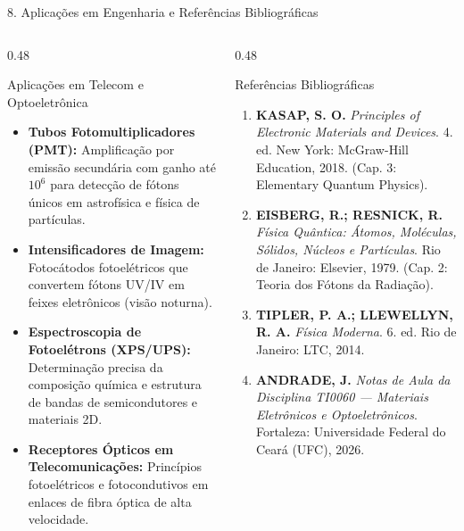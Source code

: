 \documentclass[aspectratio=169, 10pt]{beamer}
\begin{document}
\begin{frame}{8. Aplicações em Engenharia e Referências Bibliográficas}
  \vspace{-0.15cm}
  \begin{columns}[T]
    \begin{column}{0.48\textwidth}
      \begin{block}{Aplicações em Telecom e Optoeletrônica}
        \scriptsize
        \begin{itemize}
          \item \textbf{Tubos Fotomultiplicadores (PMT):} Amplificação por emissão secundária com ganho até $10^6$ para detecção de fótons únicos em astrofísica e física de partículas.
          \item \textbf{Intensificadores de Imagem:} Fotocátodos fotoelétricos que convertem fótons UV/IV em feixes eletrônicos (visão noturna).
          \item \textbf{Espectroscopia de Fotoelétrons (XPS/UPS):} Determinação precisa da composição química e estrutura de bandas de semicondutores e materiais 2D.
          \item \textbf{Receptores Ópticos em Telecomunicações:} Princípios fotoelétricos e fotocondutivos em enlaces de fibra óptica de alta velocidade.
        \end{itemize}
      \end{block}
    \end{column}

    \begin{column}{0.48\textwidth}
      \begin{exampleblock}{Referências Bibliográficas}
        \scriptsize
        \begin{enumerate}
          \item \textbf{KASAP, S. O.} \textit{Principles of Electronic Materials and Devices}. 4. ed. New York: McGraw-Hill Education, 2018. (Cap. 3: Elementary Quantum Physics).
          \item \textbf{EISBERG, R.; RESNICK, R.} \textit{Física Quântica: Átomos, Moléculas, Sólidos, Núcleos e Partículas}. Rio de Janeiro: Elsevier, 1979. (Cap. 2: Teoria dos Fótons da Radiação).
          \item \textbf{TIPLER, P. A.; LLEWELLYN, R. A.} \textit{Física Moderna}. 6. ed. Rio de Janeiro: LTC, 2014.
          \item \textbf{ANDRADE, J.} \textit{Notas de Aula da Disciplina TI0060 — Materiais Eletrônicos e Optoeletrônicos}. Fortaleza: Universidade Federal do Ceará (UFC), 2026.
        \end{enumerate}
      \end{exampleblock}
    \end{column}
  \end{columns}
\end{frame}
\end{document}
